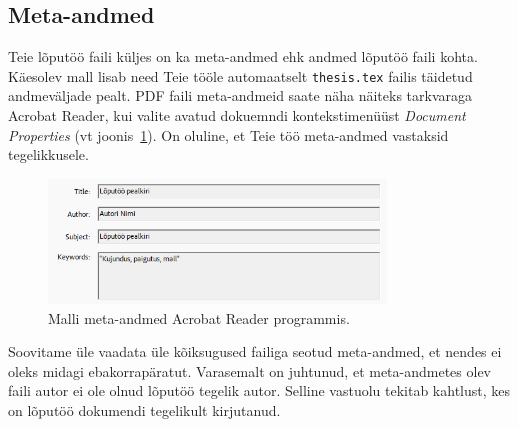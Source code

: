 \subsection{Meta-andmed}
Teie lõputöö faili küljes on ka meta-andmed ehk andmed lõputöö faili kohta. Käesolev mall lisab need Teie tööle automaatselt \verb|thesis.tex| failis täidetud andmeväljade pealt. PDF faili meta-andmeid saate näha näiteks tarkvaraga Acrobat Reader, kui valite avatud dokuemndi kontekstimenüüst \emph{Document Properties} (vt joonis~\ref{fig:metaAndmed}). On oluline, et Teie töö meta-andmed vastaksid tegelikkusele.

\begin{figure}[htb!]
    \centering
    \captionsetup{justification=centering}
    \includegraphics[width=0.8\textwidth]{figures/Joonis4-MetaAndmed.png}
    \caption{Malli meta-andmed Acrobat Reader programmis.}
    \label{fig:metaAndmed}
\end{figure}

Soovitame üle vaadata üle kõiksugused failiga seotud meta-andmed, et nendes ei oleks midagi ebakorrapäratut. Varasemalt on juhtunud, et meta-andmetes olev faili autor ei ole olnud lõputöö tegelik autor. Selline vastuolu tekitab kahtlust, kes on lõputöö dokumendi tegelikult kirjutanud.
